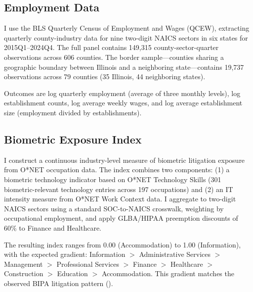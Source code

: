 \documentclass[12pt]{article}
\begin{document}
\subsection{Employment Data}

I use the BLS Quarterly Census of Employment and Wages (QCEW), extracting quarterly county-industry data for nine two-digit NAICS sectors in six states for 2015Q1--2024Q4. The full panel contains 149,315 county-sector-quarter observations across 606 counties. The border sample---counties sharing a geographic boundary between Illinois and a neighboring state---contains 19,737 observations across 79 counties (35 Illinois, 44 neighboring states).

Outcomes are log quarterly employment (average of three monthly levels), log establishment counts, log average weekly wages, and log average establishment size (employment divided by establishments).

\subsection{Biometric Exposure Index}

I construct a continuous industry-level measure of biometric litigation exposure from O*NET occupation data. The index combines two components: (1) a biometric technology indicator based on O*NET Technology Skills (301 biometric-relevant technology entries across 197 occupations) and (2) an IT intensity measure from O*NET Work Context data. I aggregate to two-digit NAICS sectors using a standard SOC-to-NAICS crosswalk, weighting by occupational employment, and apply GLBA/HIPAA preemption discounts of 60\% to Finance and Healthcare.

The resulting index ranges from 0.00 (Accommodation) to 1.00 (Information), with the expected gradient: Information $>$ Administrative Services $>$ Management $>$ Professional Services $>$ Finance $>$ Healthcare $>$ Construction $>$ Education $>$ Accommodation. This gradient matches the observed BIPA litigation pattern ().
\end{document}
